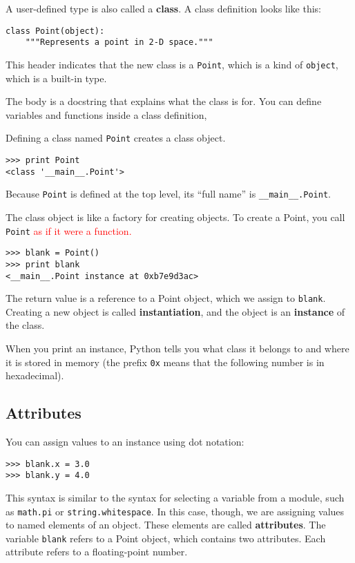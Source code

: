 \documentclass{article}
\begin{document}
A user-defined type is also called a \textbf{class}.
A class definition looks like this:

\begin{lstlisting}
class Point(object):
    """Represents a point in 2-D space."""
\end{lstlisting}

This header indicates that the new class is a \verb|Point|, which is a
kind of \verb|object|, which is a built-in type.

The body is a docstring that explains what the class is for.
You can define variables and functions inside a class definition,

Defining a class named \verb|Point| creates a class object.
\begin{lstlisting}
>>> print Point
<class '__main__.Point'>
\end{lstlisting}
Because \verb|Point| is defined at the top level, its ``full name'' is
\verb|__main__.Point|.

The class object is like a factory for creating objects.
To create a Point, you call \verb|Point|
\textcolor{red}{as if it were a function.}
\begin{lstlisting}
>>> blank = Point()
>>> print blank
<__main__.Point instance at 0xb7e9d3ac>
\end{lstlisting}
The return value is a reference to a Point object, which we assign to
\verb|blank|. Creating a new object is called \textbf{instantiation},
and the object is an
\textbf{instance} of the class.

When you print an instance, Python tells you what
class it belongs to and where it is stored in memory (the prefix
\verb|0x| means that the following number is in hexadecimal).

\subsection{Attributes}
You can assign values to an instance using dot notation:
\begin{lstlisting}
>>> blank.x = 3.0
>>> blank.y = 4.0
\end{lstlisting}
This syntax is similar to the syntax for selecting a variable from a
module, such as \verb|math.pi| or \verb|string.whitespace|.
In this case, though, we are assigning values to named elements of
an object. These elements are called \textbf{attributes}.
The variable \verb|blank| refers to a Point object, which contains
two attributes. Each attribute refers to a floating-point number.
\end{document}
